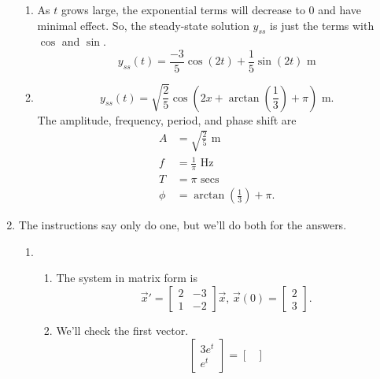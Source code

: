 \begin{enumerate}[label=\arabic*.]
\begin{enumerate}[label=(\alph*)]
				\item
					As $t$ grows large, the exponential terms will decrease to 0 and have minimal effect.
					So, the steady-state solution $y_{ss}$ is just the terms with $\cos$ and $\sin$.
					\begin{equation*}
						y_{ss}(t) = \frac{-3}{5}\cos{(2t)} + \frac{1}{5}\sin{(2t)} \text{ m}
					\end{equation*}
				\item
					\begin{equation*}
						y_{ss}(t) = \sqrt{\frac{2}{5}}\cos{\left(2x + \arctan{\left(\frac{1}{3}\right)} + \pi\right)} \text{ m}.
					\end{equation*}
					The amplitude, frequency, period, and phase shift are
					\begin{align*}
						A &= \sqrt{\frac{2}{5}} \text{ m} \\
						f &= \frac{1}{\pi} \text{ Hz} \\
						T &= \pi \text{ secs} \\
						\phi &= \arctan{\left(\frac{1}{3}\right)} + \pi.
					\end{align*}
			\end{enumerate}
		\item
			The instructions say only do one, but we'll do both for the answers.
			\begin{enumerate}[label=(\alph*)]
				\item
					\begin{enumerate}[label=(\roman*)]
						\item
							The system in matrix form is
							\begin{equation*}
								\vec{x}' = \begin{bmatrix}
									2 & -3 \\
									1 & -2
								\end{bmatrix}\vec{x} \text{, } \vec{x}(0) = \begin{bmatrix}
									2 \\
									3
								\end{bmatrix}.
							\end{equation*}
						\item
							We'll check the first vector.
							\begin{equation*}
								\begin{bmatrix}
									3e^t \\
									e^t
								\end{bmatrix} = \begin{bmatrix}

\end{bmatrix}
\end{equation*}
\end{enumerate}
\end{enumerate}
\end{enumerate}
